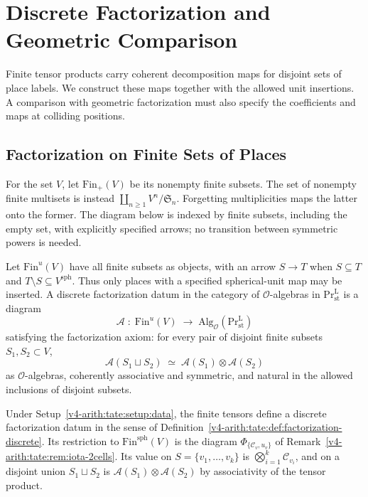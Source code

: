 \section{Discrete Factorization and Geometric Comparison}
\label{v4-arith:tate:bd-factorization}

Finite tensor products carry coherent decomposition maps for
disjoint sets of place labels. We construct these maps together
with the allowed unit insertions. A comparison with geometric
factorization must also specify the coefficients and maps at
colliding positions.

\subsection{Factorization on Finite Sets of Places}

\begin{setup}
\label{v4-arith:tate:setup:ran-discrete}
For the set \(V\), let \(\mathrm{Fin}_{+}(V)\) be its nonempty
finite subsets. The set of nonempty finite multisets is instead
\(\coprod_{n\geq1}V^n/\mathfrak S_n\). Forgetting multiplicities
maps the latter onto the former. The diagram below is indexed by
finite subsets, including the empty set, with explicitly specified
arrows; no transition between symmetric powers is needed.
\end{setup}

\begin{definition}
\label{v4-arith:tate:def:factorization-discrete}
Let \(\mathrm{Fin}^{u}(V)\) have all finite subsets as objects,
with an arrow \(S\to T\) when \(S\subseteq T\) and
\(T\setminus S\subseteq V^{\mathrm{sph}}\). Thus only places
with a specified spherical-unit map may be inserted. A discrete
factorization datum in the category of
\(\mathcal{O}\)-algebras in \(\mathrm{Pr}^{\mathrm{L}}_{\mathrm{st}}\)
is a diagram
\[
\mathcal{A}\;:\;\mathrm{Fin}^{u}(V)\;\longrightarrow\;\mathrm{Alg}_{\mathcal{O}}(\mathrm{Pr}^{\mathrm{L}}_{\mathrm{st}})
\]
satisfying the factorization axiom: for every pair of disjoint
finite subsets \(S_{1},S_{2}\subset V\),
\[
\mathcal{A}(S_{1}\sqcup S_{2})\;\simeq\;\mathcal{A}(S_{1})\otimes\mathcal{A}(S_{2})
\]
as \(\mathcal{O}\)-algebras, coherently associative and symmetric,
and natural in the allowed inclusions of disjoint subsets.
\end{definition}

\begin{theorem}
\label{v4-arith:tate:thm:BD-automatic-discrete}
\ClaimStatusProvedHere Under Setup~\ref{v4-arith:tate:setup:data},
the finite tensors define a discrete factorization datum in the
sense of Definition~\ref{v4-arith:tate:def:factorization-discrete}.
Its restriction to \(\mathrm{Fin}^{\mathrm{sph}}(V)\) is the
diagram \(\Phi_{\{\mathcal C_v,u_v\}}\) of
Remark~\ref{v4-arith:tate:rem:iota-2cells}. Its value
on \(S=\{v_{1},\ldots,v_{k}\}\) is
\(\bigotimes_{i=1}^{k}\mathcal{C}_{v_{i}}\), and on a disjoint union
\(S_{1}\sqcup S_{2}\) is
\(\mathcal{A}(S_{1})\otimes\mathcal{A}(S_{2})\) by associativity of
the tensor product.
\end{theorem}

